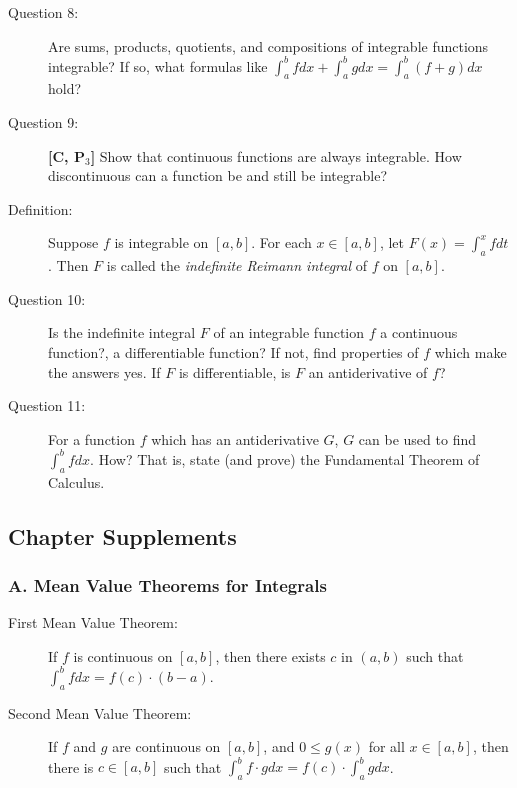 \documentclass{article}
\begin{document}
\begin{description}
  \item[Question 8:] Are sums, products, quotients, and compositions of integrable functions integrable? If so, what formulas like $\int_a^b f dx + \int_a^b g dx = \int_a^b (f+g) dx$ hold?

  \item[Question 9:] \textbf{[C, P$_3$]} Show that continuous functions are always integrable. How discontinuous can a function be and still be integrable?

  \item[Definition:] Suppose $f$ is integrable on $[a,b]$. For each $x \in [a,b]$, let $F(x) = \int_a^x f dt$. Then $F$ is called the \emph{indefinite Reimann integral} of $f$ on $[a,b]$.

  \item[Question 10:] Is the indefinite integral $F$ of an integrable function $f$ a continuous function?, a differentiable function? If not, find properties of $f$ which make the answers yes. If $F$ is differentiable, is $F$ an antiderivative of $f$?

  \item[Question 11:] For a function $f$ which has an antiderivative $G$, $G$ can be used to find $\int_a^b f dx$. How? That is, state (and prove) the Fundamental Theorem of Calculus.

\end{description}


\subsection*{Chapter Supplements}


\subsubsection*{A. Mean Value Theorems for Integrals}

\begin{description}

  \item[First Mean Value Theorem:] If $f$ is continuous on $[a,b]$, then there exists $c$ in $(a,b)$ such that $\int_a^b f dx = f(c) \cdot (b-a)$.

  \item[Second Mean Value Theorem:] If $f$ and $g$ are continuous on $[a,b]$, and $0 \leq g(x)$ for all $x \in [a,b]$, then there is $c \in [a,b]$ such that $\int_a^b f \cdot g dx = f(c) \cdot \int_a^b g dx$.

\end{description}
\end{document}
